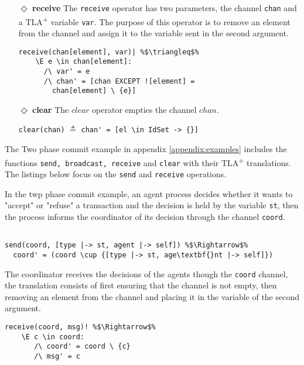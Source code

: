 \documentclass[journal]{IEEEtran}
\newcommand{\tlaplus}{TLA\textsuperscript{+}\xspace}
\begin{document}
\begin{itemize}
\begin{lstlisting}[frame = none, numbers = none, escapechar=\%]
chan' = [a \in DOMAIN chan |-> 
					IF a \in sub
					THEN chan[a] \cup {msg}
					ELSE chan[a]]
\end{lstlisting}

\item[$\Diamond$]  \textbf{receive}
The \verb|receive| operator has two parameters, the channel \verb|chan| and a \tlaplus variable \verb|var|. The purpose of this operator is to remove an element from the channel and assign it to the variable sent in the second argument.

\begin{lstlisting}[frame = none, numbers = none, escapechar=\%]
receive(chan[element], var)| %$\triangleq$%
    \E e \in chan[element]:
      /\ var' = e
      /\ chan' = [chan EXCEPT ![element] =
        chan[element] \ {e}]
\end{lstlisting}

\item[$\Diamond$]  \textbf{clear}
The $clear$ operator empties the channel $chan$.

\lstinline|clear(chan)| $\triangleq$
\lstinline|chan' = [el \in IdSet -> {}]|

\end{itemize} 

The Two phase commit example in appendix \ref{appendix:examples} includes the functions \verb|send, broadcast, receive| and \verb|clear| with their \tlaplus translations. The listings below focus on the \verb|send| and \verb|receive| operations.\newline 

In the twp phase commit example, an agent process decides whether it wants to "accept" or "refuse" a transaction and the decision is held by the variable \verb|st|, then the process informs the coordinator of its decision through the channel \verb|coord|.

\begin{lstlisting}[frame = none, numbers = none, escapechar=\%]

send(coord, [type |-> st, agent |-> self]) %$\Rightarrow$%
  coord' = (coord \cup {[type |-> st, age\textbf{}nt |-> self]})
\end{lstlisting}


The coordinator receives the decisions of the agents though the \verb|coord| channel, the translation consists of first ensuring that the channel is not empty, then removing an element from the channel and placing it in the variable of the second argument. 

\begin{lstlisting}[frame = none, numbers = none, escapechar=\%]
receive(coord, msg)! %$\Rightarrow$%
    \E c \in coord:
	   /\ coord' = coord \ {c}
	   /\ msg' = c
\end{lstlisting}
\end{document}
